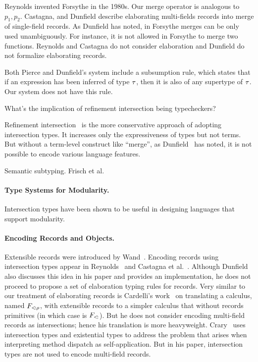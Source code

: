 Reynolds invented Forsythe in the 1980s. Our merge operator is analogous to
$ p_1, p_2 $. Castagna, and Dunfield describe elaborating multi-fields records
into merge of single-field records. As Dunfield has noted, in Forsythe merges
can be only used unambiguously. For instance, it is not allowed in Forsythe to
merge two functions. Reynolds and Castagna do not consider elaboration and
Dunfield do not formalize elaborating records.

Both Pierce and Dunfield's system include a subsumption rule, which states that
if an expression has been inferred of type $ \tau $, then it is also of any
supertype of $ \tau $. Our system does not have this rule.

What's the implication of refinement intersection being typecheckers?

Refinement intersection~\cite{dunfield2007refined,freeman1991refinement} is the
more conservative approach of adopting intersection types. It increases only the
expressiveness of types but not terms. But without a term-level construct like
``merge'', as Dunfield~\cite{dunfield2014elaborating} has noted, it is not
possible to encode various language features. \cite{davies2005practical}
\cite{dunfield2007refined}

Semantic subtyping. Frisch et al.~\cite{frisch2008semantic}

\paragraph{Type Systems for Modularity.}

Intersection types have been shown to be useful in designing languages that
support modularity.~\cite{nystrom2006j}

\cite{oliveira2013feature}

\paragraph{Encoding Records and Objects.}

Extensible records were introduced by Wand~\cite{wand1987complete}. Encoding
records using intersection types appear in Reynolds~\cite{reynolds1997design}
and Castagna et al.~\cite{castagna1995calculus}. Although Dunfield also
discusses this idea in his paper \cite{dunfield2014elaborating} and provides an
implementation, he does not proceed to propose a set of elaboration typing rules
for records. Very similar to our treatment of elaborating records is Cardelli's
work~\cite{cardelli1992extensible} on translating a calculus, named
$ F_{<\!: \rho}$, with extensible records to a simpler calculus that without
records primitives (in which case is $ F_{<\!:} $). But he does not consider
encoding multi-field records as intersections; hence his translation is more
heavyweight. Crary~\cite{crary1998simple} uses intersection types and
existential types to address the problem that arises when interpreting method
dispatch as self-application. But in his paper, intersection types are not used
to encode multi-field records.

